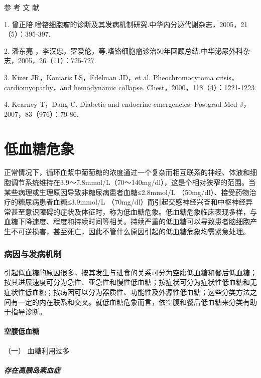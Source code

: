 \hypertarget{text00119.htmlux5cux23CHP4-12-4}{}
参 考 文 献

1.
曾正陪.嗜铬细胞瘤的诊断及其发病机制研究.中华内分泌代谢杂志，2005，21（5）：395-397.

2. 潘东亮
，李汉忠，罗爱伦，等.嗜铬细胞瘤诊治50年回顾总结.中华泌尿外科杂志，2005，26（11）：725-727.

3. Kizer JR，Koniaris LS，Edelman JD，et al. Pheochromocytoma
crisis，cardiomyopathy，and hemodynamic collapse.
Chest，2000，118（4）：1221-1223.

4. Kearney T，Dang C. Diabetic and endocrine emergencies. Postgrad Med
J，2007，83（976）：79-86.

\protect\hypertarget{text00120.html}{}{}

\chapter{低血糖危象}

正常情况下，循环血浆中葡萄糖的浓度通过一个复杂而相互联系的神经、体液和细胞调节系统维持在3.9～7.8mmol/L（70～140mg/dl），这是个相对狭窄的范围。当某些病理或生理原因导致非糖尿病患者血糖≤2.8mmol/L
（50mg/dl）、接受药物治疗的糖尿病患者血糖≤3.9mmol/L
（70mg/dl）而引起交感神经兴奋和中枢神经异常甚至意识障碍的症状及体征时，称为低血糖危象。低血糖危象临床表现多样，与血糖下降速度、程度和持续时间等相关。持续严重的低血糖可以导致患者脑细胞产生不可逆损害，甚至死亡，因此不管什么原因引起的低血糖危象均需紧急处理。

\subsection{病因与发病机制}

引起低血糖的原因很多，按其发生与进食的关系可分为空腹低血糖和餐后低血糖；按其进展速度可分为急性、亚急性和慢性低血糖；按症状可分为症状性低血糖和无症状性低血糖；按病因可以分为器质性、功能性及外源性低血糖；这些分类方法之间有一定的内在联系和交叉。就低血糖危象而言，依空腹和餐后低血糖来分类有助于指导诊断。

\subsubsection{空腹低血糖}

\hypertarget{text00120.htmlux5cux23CHP4-13-1-1-1}{}
（一） 血糖利用过多

\paragraph{存在高胰岛素血症}

